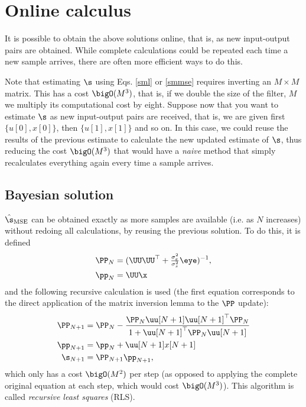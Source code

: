 \section{Online calculus}

It is possible to obtain the above solutions online, that is, as new input-output pairs are obtained. While complete calculations could be repeated each time a new sample arrives, there are often more efficient ways to do this.

Note that estimating $\s$ using Eqs. \eqref{sml} or \eqref{smmse} requires inverting an $M \times M$ matrix. This has a cost $\bigO (M^3)$, that is, if we double the size of the filter, $M$ we multiply its computational cost by eight. Suppose now that you want to estimate $\s$ as new input-output pairs are received, that is, we are given first $\{u[0], x[0] \}$, then $\{u[1], x[1] \} $ and so on. In this case, we could reuse the results of the previous estimate to calculate the new updated estimate of $\s$, thus reducing the cost $\bigO(M^3) $ that would have a {\em naive} method that simply recalculates everything again every time a sample arrives.

\subsection{Bayesian solution}

$\hat\s_\text{MSE}$ can be obtained exactly as more samples are available (i.e. as $N$ increases) without redoing all calculations, by reusing the previous solution. To do this, it is defined
\begin{align}
\PP_N &= (\UU \UU^\top + \tfrac{\sigma_\varepsilon^2}{\sigma_s^2}\eye)^{-1}, \\ \pp_N &= \UU \x
\end{align}
and the following recursive calculation is used (the first equation corresponds to the direct application of the matrix inversion lemma to the $\PP$ update):
\begin{align*}
\PP_{N+1} 
	&= \PP_N -\frac{\PP_N\uu[N+1]\uu[N+1]^\top 
	   \PP_N}{1  +\uu[N+1]^\top  \PP_N\uu[N+1]}  \\
\pp_{N+1} 
    &= \pp_N  +\uu[N+1] x[N+1] \\
\s_{N+1}
    &= \PP_{N+1}\pp_{N+1} ,
\end{align*}
which only has a cost $\bigO(M^2)$ per step (as opposed to applying the complete original equation at each step, which would cost $\bigO(M^3) $). This algorithm is called \emph{recursive least squares} (RLS).


